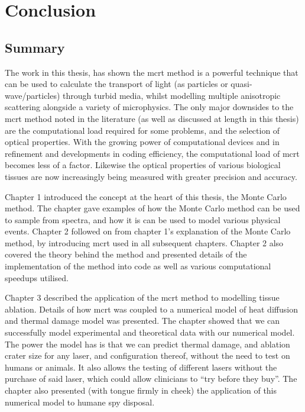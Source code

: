 \chapter{Conclusion}

\section{Summary}

The work in this thesis, has shown the \gls*{mcrt} method is a powerful technique that can be used to calculate the transport of light (as particles or quasi-wave/particles) through turbid media, whilst modelling multiple anisotropic scattering alongside a variety of microphysics.
The only major downsides to the \gls*{mcrt} method noted in the literature (as well as discussed at length in this thesis) are the computational load required for some problems, and the selection of optical properties.
With the growing power of computational devices and in refinement and developments in coding efficiency, the computational load of \gls*{mcrt} becomes less of a factor.
Likewise the optical properties of various biological tissues are now increasingly being measured with greater precision and accuracy.

\medskip

Chapter 1 introduced the concept at the heart of this thesis, the Monte Carlo method.
The chapter gave examples of how the Monte Carlo method can be used to sample from spectra, and how it is can be used to model various physical events.
Chapter 2 followed on from chapter 1's explanation of the Monte Carlo method, by introducing \gls*{mcrt} used in all subsequent chapters.
Chapter 2 also covered the theory behind the method and presented details of the implementation of the method into code as well as various computational speedups utilised.

\medskip

Chapter 3 described the application of the \gls*{mcrt} method to modelling tissue ablation.
Details of how \gls*{mcrt} was coupled to a numerical model of heat diffusion and thermal damage model was presented.
The chapter showed that we can successfully model experimental and theoretical data with our numerical model.
The power the model has is that we can predict thermal damage, and ablation crater size for any laser, and configuration thereof, without the need to test on humans or animals.
It also allows the testing of different lasers without the purchase of said laser, which could allow clinicians to ``try before they buy''.
The chapter also presented (with tongue firmly in cheek) the application of this numerical model to humane spy disposal.

